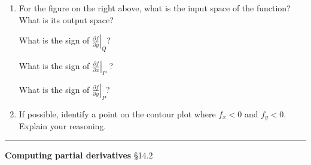 \documentclass[12pt,letterpaper,noanswers]{exam}
\newcommand{\mb}[1]{\underline{#1}}
\begin{document}
\begin{enumerate}
\item
For the figure on the right above, what is the input space of the function?  What is its output space?

What is the sign of $\left.\frac{\partial f}{\partial y}\right\vert_Q$?

What is the sign of $\left.\frac{\partial f}{\partial x}\right\vert_P$ ?

What is the sign of $\left.\frac{\partial f}{\partial y}\right\vert_P$?


\item If possible, identify a point on the contour plot where $f_x < 0$ and $f_y<0$.  Explain your reasoning.
\end{enumerate}

\vspace{0.2cm}
\hrule
\vspace{0.2cm}










\noindent\textbf{Computing partial derivatives} \S 14.2
\end{document}
